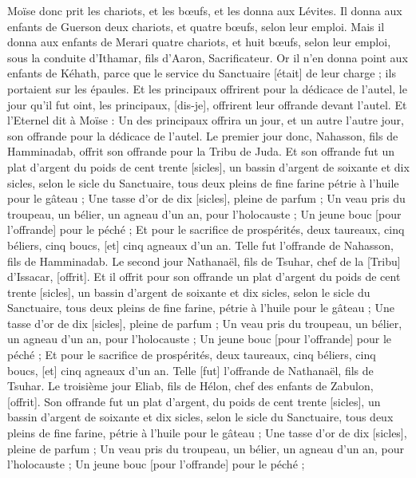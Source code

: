 \begin{multicols}{2}
Moïse donc prit les chariots, et les bœufs, et les donna aux Lévites.
Il donna aux enfants de Guerson deux chariots, et quatre bœufs, selon leur emploi.
Mais il donna aux enfants de Merari quatre chariots, et huit bœufs, selon leur emploi, sous la conduite d'Ithamar, fils d'Aaron, Sacrificateur.
Or il n'en donna point aux enfants de Kéhath, parce que le service du Sanctuaire [était] de leur charge ; ils portaient sur les épaules.
Et les principaux offrirent pour la dédicace de l'autel, le jour qu'il fut oint, les principaux, [dis-je], offrirent leur offrande devant l'autel.
Et l'Eternel dit à Moïse : Un des principaux offrira un jour, et un autre l'autre jour, son offrande pour la dédicace de l'autel.
Le premier jour donc, Nahasson, fils de Hamminadab, offrit son offrande pour la Tribu de Juda.
Et son offrande fut un plat d'argent du poids de cent trente [sicles], un bassin d'argent de soixante et dix sicles, selon le sicle du Sanctuaire, tous deux pleins de fine farine pétrie à l'huile pour le gâteau ;
Une tasse d'or de dix [sicles], pleine de parfum ;
Un veau pris du troupeau, un bélier, un agneau d'un an, pour l'holocauste ;
Un jeune bouc [pour l'offrande] pour le péché ;
Et pour le sacrifice de prospérités, deux taureaux, cinq béliers, cinq boucs, [et] cinq agneaux d'un an. Telle fut l'offrande de Nahasson, fils de Hamminadab.
Le second jour Nathanaël, fils de Tsuhar, chef de la [Tribu] d'Issacar, [offrit].
Et il offrit pour son offrande un plat d'argent du poids de cent trente [sicles], un bassin d'argent de soixante et dix sicles, selon le sicle du Sanctuaire, tous deux pleins de fine farine, pétrie à l'huile pour le gâteau ;
Une tasse d'or de dix [sicles], pleine de parfum ;
Un veau pris du troupeau, un bélier, un agneau d'un an, pour l'holocauste ;
Un jeune bouc [pour l'offrande] pour le péché ;
Et pour le sacrifice de prospérités, deux taureaux, cinq béliers, cinq boucs, [et] cinq agneaux d'un an. Telle [fut] l'offrande de Nathanaël, fils de Tsuhar.
Le troisième jour Eliab, fils de Hélon, chef des enfants de Zabulon, [offrit].
Son offrande fut un plat d'argent, du poids de cent trente [sicles], un bassin d'argent de soixante et dix sicles, selon le sicle du Sanctuaire, tous deux pleins de fine farine, pétrie à l'huile pour le gâteau ;
Une tasse d'or de dix [sicles], pleine de parfum ;
Un veau pris du troupeau, un bélier, un agneau d'un an, pour l'holocauste ;
Un jeune bouc [pour l'offrande] pour le péché ;

\end{multicols}
